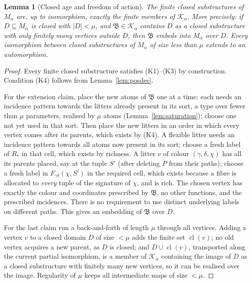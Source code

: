 \documentclass[11pt]{article}
\newtheorem{lemma}[theorem]{Lemma}
\theoremstyle{definition}
\theoremstyle{remark}
\newcommand{\cl}{\operatorname{cl}}
\newcommand{\calK}{\mathcal K}
\begin{document}
\begin{lemma}[Closed age and freedom of action]\label{lem:foa}
The finite closed substructures of \(M_\alpha\) are, up to isomorphism,
exactly the finite members of \(\calK_\alpha\). More precisely: if
\(D\subseteq M_\alpha\) is closed with \(|D|<\mu\), and \(\mathfrak B\in
\calK_\alpha\) contains \(D\) as a closed substructure with only finitely
many vertices outside \(D\), then \(\mathfrak B\) embeds into \(M_\alpha\)
over \(D\). Every isomorphism between closed substructures of \(M_\alpha\)
of size less than \(\mu\) extends to an automorphism.
\end{lemma}
\begin{proof}
Every finite closed substructure satisfies (K1)--(K3) by construction.
Condition (K4) follows from Lemma~\ref{lem:posdec}.

For the extension claim, place the new atoms of \(\mathfrak B\) one at a
time: each needs an incidence pattern towards the litters already present
in its sort, a type over fewer than \(\mu\) parameters, realised by
\(\mu\) atoms (Lemma~\ref{lem:saturation}); choose one not yet used in
that sort. Then place the new litters in an order in which every vertex
comes after its parents, which exists by (K4). A flexible litter needs an
incidence pattern towards all atoms now present in its sort; choose a
fresh label of \(R_*\) in that cell, which exists by richness. A litter
\(v\) of colour \((\gamma,\delta,\chi)\) has all its parents placed, say at
the tuple \(S'\) (after deleting \(P\) from their paths); choose a fresh
label in \(F_{\gamma\delta}(\chi,S')\) in the required cell, which exists
because a fibre is allocated to \emph{every} tuple of the signature of
\(\chi\), and is rich. The chosen vertex has exactly the colour and
coordinates prescribed by \(\mathfrak B\), no other functions, and the
prescribed incidences. There is no requirement to use distinct underlying
labels on different paths. This gives an embedding of \(\mathfrak B\) over \(D\).

For the last claim run a back-and-forth of length \(\mu\) through all
vertices. Adding a vertex \(v\) to a closed domain \(D\) of size \(<\mu\)
adds the finite set \(\cl(v)\); no old vertex acquires a new parent, as
\(D\) is closed; and \(D\cup\cl(v)\), transported along the current
partial isomorphism, is a member of \(\calK_\alpha\) containing the image
of \(D\) as a closed substructure with finitely many new vertices, so it
can be realised over the image. Regularity of \(\mu\) keeps all
intermediate maps of size \(<\mu\).
\end{proof}
\end{document}

